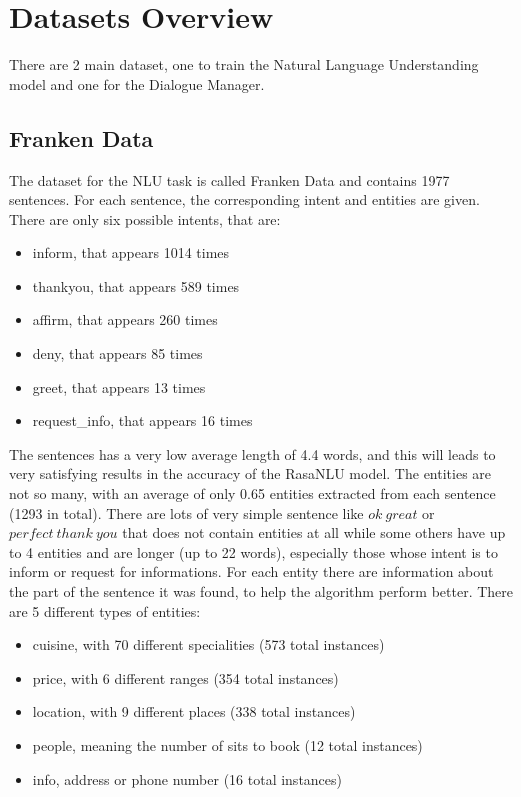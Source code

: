 \documentclass[11pt,a4paper]{article}
\begin{document}
\section{Datasets Overview}

There are 2 main dataset, one to train the Natural Language Understanding model and one for the Dialogue Manager.

\subsection{Franken Data}

The dataset for the NLU task is called Franken Data and contains 1977 sentences. For each sentence, the corresponding intent and entities are given. There are only six possible intents, that are: 

\begin{itemize}
\item inform, that appears 1014 times
\item thankyou, that appears 589 times
\item affirm, that appears 260 times
\item deny, that appears 85 times
\item greet, that appears 13 times
\item request\_info, that appears 16 times
\end{itemize}

The sentences has a very low average length of 4.4 words, and this will leads to very satisfying results in the accuracy of the RasaNLU model.
The entities are not so many, with an average of only 0.65 entities extracted from each sentence (1293 in total). There are lots of very simple sentence like $ok\ great$ or $perfect\ thank\ you$ that does not contain entities at all while some others have up to 4 entities and are longer (up to 22 words), especially those whose intent is to inform or request for informations. For each entity there are information about the part of the sentence it was found, to help the algorithm perform better. There are 5 different types of entities:

\begin{itemize}
\item cuisine, with 70 different specialities (573 total instances)
\item price, with 6 different ranges (354 total instances)
\item location, with 9 different places (338 total instances)
\item people, meaning the number of sits to book (12 total instances)
\item info, address or phone number (16 total instances)
\end{itemize}
\end{document}
